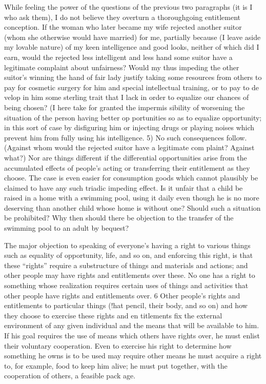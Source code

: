 \documentclass[11pt,openany]{book}
\begin{document}
While feeling the power of the questions of the previous two paragraphs (it is I who ask them), I do not believe they overturn a thoroughgoing entitlement conception. If the woman who later became my wife rejected another suitor (whom she otherwise would have married) for me, partially because (I leave aside my lovable nature) of my keen intelligence and good looks, neither of which did I earn, would the rejected less intelligent and less hand some suitor have a legitimate complaint about unfairness? Would my thus impeding the other suitor's winning the hand of fair lady justify taking some resources from others to pay for cosmetic surgery for him and special intellectual training, or to pay to de velop in him some sterling trait that I lack in order to equalize our chances of being chosen? (I here take for granted the impermis sibility of worsening the situation of the person having better op portunities so as to equalize opportunity; in this sort of case by disfiguring him or injecting drugs or playing noises which prevent him from fully using his intelligence. 5) No such consequences follow. (Against whom would the rejected suitor have a legitimate com plaint? Against what?) Nor are things different if the differential opportunities arise from the accumulated effects of people's acting or transferring their entitlement as they choose. The case is even easier for consumption goods which cannot plausibly be claimed to have any such triadic impeding effect. Is it unfair that a child be raised in a home with a swimming pool, using it daily even though he is no more deserving than another child whose home is without one? Should such a situation be prohibited? Why then should there be objection to the transfer of the swimming pool to an adult by bequest? 

The major objection to speaking of everyone's having a right to various things such as equality of opportunity, life, and so on, and enforcing this right, is that these ``rights'' require a substructure of things and materials and actions; and other people may have rights and entitlements over these. No one has a right to something whose realization requires certain uses of things and activities that other people have rights and entitlements over. 6 Other people's rights and entitlements to particular things (!hat pencil, their body, and so on) and how they choose to exercise these rights and en titlements fix the external environment of any given individual and the means that will be available to him. If his goal requires the use of means which others have rights over, he must enlist their voluntary cooperation. Even to exercise his right to determine how something he owns is to be used may require other means he must acquire a right to, for example, food to keep him alive; he must put together, with the cooperation of others, a feasible pack age. 
\end{document}
